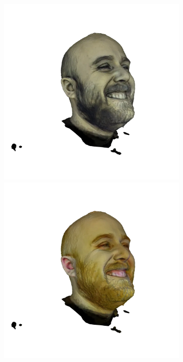 \begin{figure}
\begin{subfigure}{0.18\linewidth}
        \includegraphics[width=\textwidth]{Figures/failed/stross/3d/snapshot13.png}
        \includegraphics[width=\textwidth]{Figures/failed/stross/3d/snapshot12.png}

\end{subfigure}
\end{figure}
